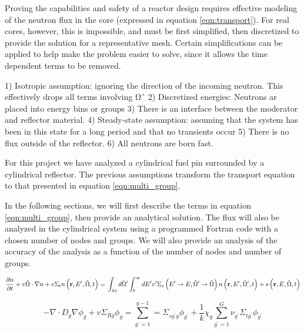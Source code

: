 \documentclass[../main.tex]{subfiles}
\begin{document}
Proving the capabilities and safety of a reactor design requires effective modeling of the neutron flux in the core (expressed in equation \ref{eqn:transport}). For real cores, however, this is impossible, and must be first simplified, then discretized to provide the solution for a representative mesh. Certain simplifications can be applied to help make the problem easier to solve, since it allows the time dependent terms to be removed.

1) Isotropic assumption: ignoring the direction of the incoming neutron. This effectively drops all terms involving Ωˆ
2) Discretized energies:  Neutrons ar placed into energy bins or groups
3) There is an interface between the moderator and reflector material.
4) Steady-state assumption: assuming that the system has been in this state for a long period and that no transients occur
5) There is no flux outside of the reflector.
6) All neutrons are born fast.



	For this project we have analyzed a cylindrical fuel pin surrounded by a cylindrical reflector.  The previous assumptions transform the transport equation to that presented in equation \ref{eqn:multi_group}.

	In the following sections, we will first describe the terms in equation \ref{eqn:multi_group}, then provide an analytical solution. The flux will also be analyzed in the cylindrical system using a programmed Fortran code with a chosen number of nodes and groups. We will also provide an analysis of the accuracy of the analysis as a function of the number of nodes and number of groups. 

	
	\begin{equation}
		\pdv{n}{t} + v \hat{\Omega} \cdot \nabla n + v \Sigma_t n \left( \mathbf{r}, E^\prime, \hat{\Omega}, t \right) = \\ \int_{4\pi} d \hat{\Omega} ^\prime \int_0^{\infty} dE ^\prime v^\prime \Sigma_s\left( E ^\prime \rightarrow E, \hat{\Omega} ^\prime \rightarrow \hat{\Omega} \right) n\left( \mathbf{r}, E ^\prime, \hat{\Omega} ^\prime, t \right) + s\left( \mathbf{r}, E, \hat{\Omega}, t \right)
		\label{eqn:transport}
	\end{equation}
	
	\begin{equation}
		- \nabla \cdot D_{g} \nabla \phi_{g}+ v \Sigma_{Rg} \phi_g = \sum_{g^'=1}^{g-1} = \Sigma_{sg^'g} \phi_{g^'} + \frac{1}{k} \chi_g \sum_{g^'=1}^{G} \nu_{g^'} \Sigma_{tg^'} \phi_{g^'} 
		\label{eqn:multi_group}
	\end{equation}
  
\end{document}

